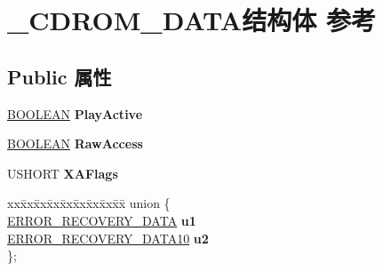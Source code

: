 \hypertarget{struct___c_d_r_o_m___d_a_t_a}{}\section{\+\_\+\+C\+D\+R\+O\+M\+\_\+\+D\+A\+T\+A结构体 参考}
\label{struct___c_d_r_o_m___d_a_t_a}
\subsection*{Public 属性}
\begin{DoxyCompactItemize}
\item 
\mbox{\label{struct___c_d_r_o_m___d_a_t_a_a6649e4fb750182db7660afbb5bb8ddad}} 
\hyperlink{_processor_bind_8h_a112e3146cb38b6ee95e64d85842e380a}{B\+O\+O\+L\+E\+AN} {\bfseries Play\+Active}
\item 
\mbox{\label{struct___c_d_r_o_m___d_a_t_a_a0d1000c557876839713c9d4cd41bddb8}} 
\hyperlink{_processor_bind_8h_a112e3146cb38b6ee95e64d85842e380a}{B\+O\+O\+L\+E\+AN} {\bfseries Raw\+Access}
\item 
\mbox{\label{struct___c_d_r_o_m___d_a_t_a_a951fce95d8e60d151eeb7191e29dde4f}} 
U\+S\+H\+O\+RT {\bfseries X\+A\+Flags}
\item 
\mbox{\label{struct___c_d_r_o_m___d_a_t_a_abf3fcb311b6c5bb41de04bc58feb205a}} 
\begin{tabbing}
xx\=xx\=xx\=xx\=xx\=xx\=xx\=xx\=xx\=\kill
union \{\\
\>\hyperlink{struct___e_r_r_o_r___r_e_c_o_v_e_r_y___d_a_t_a}{ERROR\_RECOVERY\_DATA} {\bfseries u1}\\
\>\hyperlink{struct___e_r_r_o_r___r_e_c_o_v_e_r_y___d_a_t_a10}{ERROR\_RECOVERY\_DATA10} {\bfseries u2}\\
\}; \\


\end{tabbing}
\end{DoxyCompactItemize}
